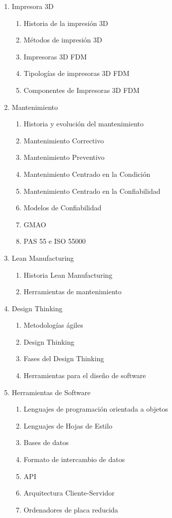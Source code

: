 		\begin{enumerate}
			\item Impresora 3D
				\begin{enumerate}
					\item Historia de la impresión 3D	
					\item Métodos de impresión 3D
					\item Impresoras 3D FDM
					\item Tipologías de impresoras 3D FDM 
					\item Componentes de Impresoras 3D FDM	
				\end{enumerate}
			\item Mantenimiento
				\begin{enumerate}
					\item Historia y evolución del mantenimiento
					\item Mantenimiento Correctivo
					\item Mantenimiento Preventivo
					\item Mantenimiento Centrado en la Condición
					\item Mantenimiento Centrado en la Confiabilidad
					\item Modelos de Confiabilidad
					\item GMAO 
					\item PAS 55 e ISO 55000
					
				\end{enumerate}					
			\item Lean Manufacturing
				\begin{enumerate}
					\item Historia Lean Manufacturing
					\item Herramientas de mantenimiento
				\end{enumerate}
			\item Design Thinking
				\begin{enumerate}
					\item Metodologías ágiles								\item Design Thinking
					\item Fases del Design Thinking
					\item Herramientas para el diseño de software
				\end{enumerate}
			\item Herramientas de Software
				\begin{enumerate}	
					\item Lenguajes de programación orientada a objetos
					\item Lenguajes de Hojas de Estilo
					\item Bases de datos 
					\item Formato de intercambio de datos
					\item API  
					\item Arquitectura Cliente-Servidor
					\item Ordenadores de placa reducida 
				\end{enumerate}						
		\end{enumerate}
		\clearpage

